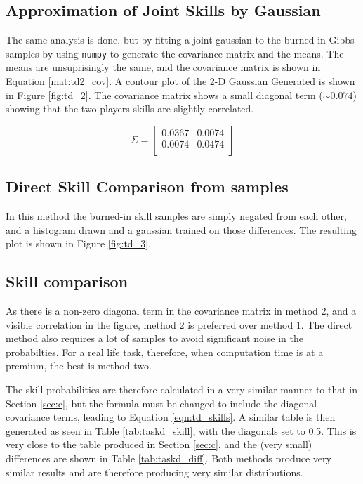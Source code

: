 \documentclass[11pt]{amsart}
\begin{document}
\subsection{Approximation of Joint Skills by Gaussian}
The same analysis is done, but by fitting a joint gaussian to the burned-in Gibbs samples by using \verb|numpy| to generate the covariance matrix and the means. The means are unsuprisingly the same, and the covariance matrix is shown in Equation \ref{mat:td2_cov}. A contour plot of the 2-D Gaussian Generated is shown in Figure \ref{fig:td_2}. The covariance matrix shows a small diagonal term ($\sim 0.074$) showing that the two players skills are slightly correlated.

\begin{equation} \label{mat:td2_cov}
    \Sigma =
    \begin{bmatrix}
        0.0367 & 0.0074 \\
        0.0074 & 0.0474 \\
    \end{bmatrix}
\end{equation}

\subsection{Direct Skill Comparison from samples}
In this method the burned-in skill samples are simply negated from each other, and a histogram drawn and a gaussian trained on those differences. The resulting plot is shown in Figure \ref{fig:td_3}.
\subsection{Skill comparison}
As there is a non-zero diagonal term in the covariance matrix in method 2, and a visible correlation in the figure, method 2 is preferred over method 1. The direct method also requires a lot of samples to avoid significant noise in the probabilties. For a real life task, therefore, when computation time is at a premium, the best is method two.

The skill probabilities are therefore calculated in a very similar manner to that in Section \ref{sec:c}, but the formula must be changed to include the diagonal covariance terms, leading to Equation \ref{eqn:td_skills}. A similar table is then generated as seen in Table \ref{tab:taskd_skill}, with the diagonals set to 0.5. This is very close to the table produced in Section \ref{sec:c}, and the (very small) differences are shown in Table \ref{tab:taskd_diff}. Both methods produce very similar results and are therefore producing very similar distributions.
\end{document}
